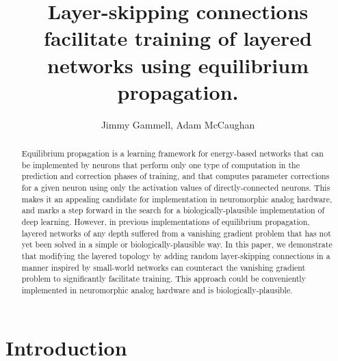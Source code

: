 \documentclass{article}
\title{Layer-skipping connections facilitate training of layered networks using equilibrium propagation.}
\author{Jimmy Gammell, Adam McCaughan}
\begin{document}
\maketitle

\begin{abstract}

Equilibrium propagation is a learning framework for energy-based networks that can be implemented by neurons that perform only one type of computation in the prediction and correction phases of training, and that computes parameter corrections for a given neuron using only the activation values of directly-connected neurons. This makes it an appealing candidate for implementation in neuromorphic analog hardware, and marks a step forward in the search for a biologically-plausible implementation of deep learning. However, in previous implementations of equilibrium propagation, layered networks of any depth suffered from a vanishing gradient problem that has not yet been solved in a simple or biologically-plausible way. In this paper, we demonstrate that modifying the layered topology by adding random layer-skipping connections in a manner inspired by small-world networks can counteract the vanishing gradient problem to significantly facilitate training. This approach could be conveniently implemented in neuromorphic analog hardware and is biologically-plausible.

\end{abstract}

\section{Introduction}
\end{document}
